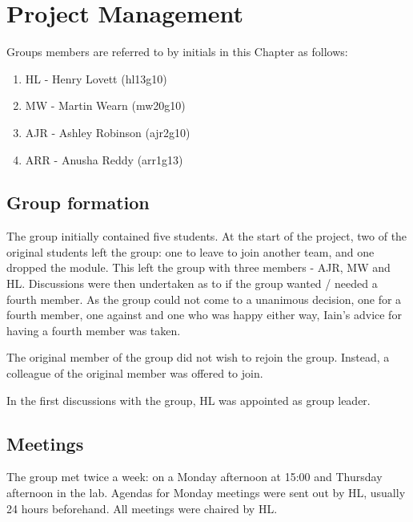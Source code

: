 
\chapter{Project Management}\label{ch:pm}

Groups members are referred to by initials in this Chapter as follows:
\begin{enumerate}
\item HL - Henry Lovett (hl13g10)
\item MW - Martin Wearn (mw20g10)
\item AJR - Ashley Robinson (ajr2g10)
\item ARR - Anusha Reddy (arr1g13)
\end{enumerate}

\section{Group formation}

The group initially contained five students. 
At the start of the project, two of the original students left the group: one to leave to join another team, and one dropped the module.
This left the group with three members - AJR, MW and HL. 
Discussions were then undertaken as to if the group wanted / needed a fourth member. 
As the group could not come to a unanimous decision, one for a fourth member, one against and one who was happy either way, Iain's advice for having a fourth member was taken. 

The original member of the group did not wish to rejoin the group.
Instead, a colleague of the original member was offered to join.

In the first discussions with the group, HL was appointed as group leader. 

\section{Meetings}

The group met twice a week: on a Monday afternoon at 15:00 and Thursday afternoon in the lab.
Agendas for Monday meetings were sent out by HL, usually 24 hours beforehand. 
All meetings were chaired by HL.


